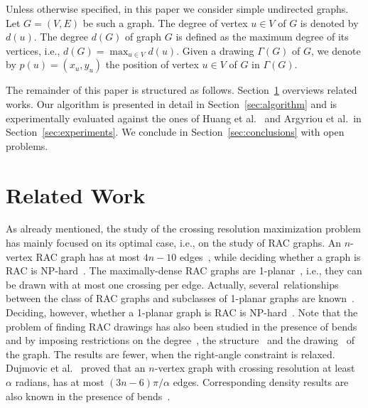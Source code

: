\documentclass[runningheads]{llncs}
\begin{document}
\medskip{}
Unless otherwise specified, in this paper we consider simple undirected graphs. Let $G=(V,E)$ be such a graph. The degree of vertex $u\in V$ of $G$ is denoted by $d(u)$. The degree $d(G)$ of  graph $G$ is defined as the maximum degree of its vertices, i.e., $d(G)=\max_{u\in V}d(u)$.
%
Given a drawing $\Gamma(G)$ of $G$, we denote by $p(u)=(x_u,y_u)$ the position of vertex $u \in V$ of $G$ in $\Gamma(G)$. %

\medskip{}
The remainder of this paper is structured as follows. Section~\ref{sec:relatedwork} overviews related works. 
Our algorithm is presented in detail in Section~\ref{sec:algorithm} and is experimentally evaluated against the ones of Huang et al.~\cite{DBLP:journals/vlc/HuangEHL13} and Argyriou et al.\ in Section~\ref{sec:experiments}. We conclude in Section~\ref{sec:conclusions} with open problems.
 
\section{Related Work}
\label{sec:relatedwork}

As already mentioned, the study of the crossing resolution maximization problem has mainly focused on its optimal case, i.e., on the study of RAC graphs. An $n$-vertex RAC graph has at most $4n-10$ edges~\cite{DBLP:journals/tcs/DidimoEL11}, while deciding whether a graph is RAC is NP-hard~\cite{DBLP:journals/jgaa/ArgyriouBS12}. The maximally-dense RAC graphs are 1-planar~\cite{DBLP:journals/dam/EadesL13}, i.e., they can be drawn with at most one crossing per edge. Actually, several~relationships between the class of RAC graphs and subclasses of 1-planar graphs are known~\cite{DBLP:journals/dam/BachmaierBHNR17,DBLP:journals/tcs/BrandenburgDEKL16}. Deciding, however, whether a 1-planar graph is RAC is NP-hard~\cite{DBLP:journals/tcs/BekosDLMM17}. Note that the problem of finding RAC drawings has also been studied in the presence of bends~\cite{DBLP:journals/jgaa/AngeliniCDFBKS11,DBLP:journals/comgeo/ArikushiFKMT12,DBLP:journals/tcs/DidimoEL11,DBLP:journals/mst/GiacomoDLM11} and by imposing restrictions on the degree~\cite{DBLP:conf/s-egc/AngeliniBDFHKLL11}, the structure~\cite{DBLP:journals/ipl/DidimoEL10} and the drawing~\cite{DBLP:journals/algorithmica/GiacomoDEL14,DBLP:conf/wg/HongN15} of the graph. The results are fewer, when the right-angle constraint is relaxed. Dujmovic et al.~\cite{DBLP:journals/cjtcs/DujmovicGMW11} proved that an $n$-vertex graph with crossing resolution at least $\alpha$ radians, has at most $(3n-6)\pi/\alpha$ edges. Corresponding density results are also known in the presence of bends~\cite{DBLP:journals/siamdm/AckermanFT12,DBLP:journals/mst/GiacomoDLM11}.
\end{document}
